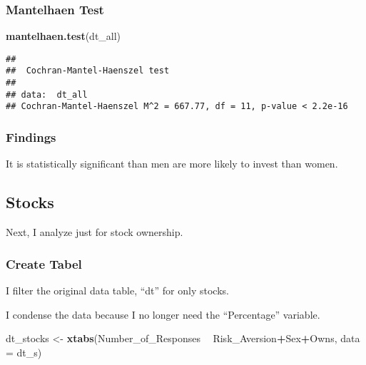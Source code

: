 \documentclass[
]{article}
\newenvironment{Shaded}{\begin{snugshade}}{\end{snugshade}}
\newcommand{\DataTypeTok}[1]{\textcolor[rgb]{0.13,0.29,0.53}{#1}}
\newcommand{\KeywordTok}[1]{\textcolor[rgb]{0.13,0.29,0.53}{\textbf{#1}}}
\newcommand{\NormalTok}[1]{#1}
\newcommand{\OperatorTok}[1]{\textcolor[rgb]{0.81,0.36,0.00}{\textbf{#1}}}
\newcommand{\StringTok}[1]{\textcolor[rgb]{0.31,0.60,0.02}{#1}}
\begin{document}
\hypertarget{mantelhaen-test}{%
\subsubsection{Mantelhaen Test}\label{mantelhaen-test}}

\begin{Shaded}
\begin{Highlighting}[]
\KeywordTok{mantelhaen.test}\NormalTok{(dt_all)}
\end{Highlighting}
\end{Shaded}

\begin{verbatim}
## 
##  Cochran-Mantel-Haenszel test
## 
## data:  dt_all
## Cochran-Mantel-Haenszel M^2 = 667.77, df = 11, p-value < 2.2e-16
\end{verbatim}

\hypertarget{findings}{%
\subsubsection{Findings}\label{findings}}

It is statistically significant than men are more likely to invest than
women.

\hypertarget{stocks}{%
\subsection{Stocks}\label{stocks}}

Next, I analyze just for stock ownership.

\hypertarget{create-tabel}{%
\subsubsection{Create Tabel}\label{create-tabel}}

I filter the original data table, ``dt'' for only stocks.

\begin{Shaded}
\end{Shaded}

I condense the data because I no longer need the ``Percentage''
variable.

\begin{Shaded}
\begin{Highlighting}[]
\NormalTok{dt_stocks <-}\StringTok{ }\KeywordTok{xtabs}\NormalTok{(Number_of_Responses }\OperatorTok{~}\StringTok{ }\NormalTok{Risk_Aversion}\OperatorTok{+}\NormalTok{Sex}\OperatorTok{+}\NormalTok{Owns, }\DataTypeTok{data =}\NormalTok{ dt_s)}
\end{Highlighting}
\end{Shaded}
\end{document}
